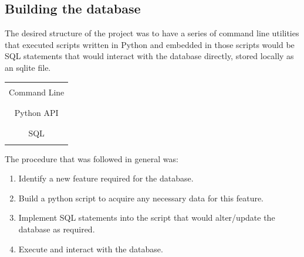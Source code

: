 \documentclass[11pt, a4paper]{article}
\begin{document}
\begin{multicols}{2}
\subsection{Building the database}
The desired structure of the project was to have a series of command line utilities that executed scripts written in Python and embedded in those scripts would be SQL statements that would interact with the database directly, stored locally as an sqlite file.
\begin{center}
\begin{tabular}{|c|}
\hline\\
\quad Command Line \quad \\
\\
\hline \\
\quad Python API  \quad \\
\\
\hline \\
SQL \\
\\
\hline 
\end{tabular}
\end{center}
The procedure that was followed in general was:
\begin{enumerate}
\item  Identify a new feature required for the database.
\item Build a python script to acquire any necessary data for this feature.
\item  Implement SQL statements into the script that would alter/update the database as required.
\item  Execute and interact with the database.
\end{enumerate}

\end{multicols}
\end{document}
